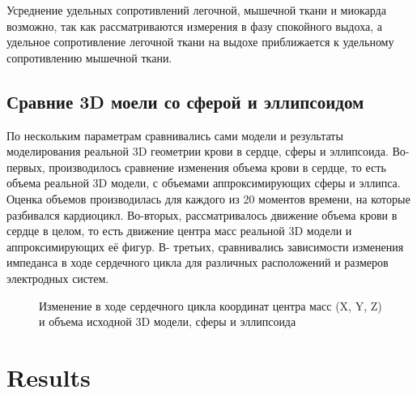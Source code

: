 \documentclass[conference]{IEEEtran}
\begin{document}
Усреднение удельных сопротивлений легочной, мышечной ткани и миокарда возможно, так как рассматриваются измерения в фазу спокойного выдоха, а удельное сопротивление легочной ткани на выдохе приближается к удельному сопротивлению мышечной ткани.

\subsection{Сравние 3D моели со сферой и эллипсоидом}

По нескольким параметрам сравнивались сами модели и результаты моделирования реальной 3D геометрии крови в сердце, сферы и эллипсоида.
Во-первых, производилось сравнение изменения объема крови в сердце, то есть объема реальной 3D модели, с объемами аппроксимирующих сферы и эллипса. Оценка объемов производилась для каждого из 20 моментов времени, на которые разбивался кардиоцикл.
Во-вторых, рассматривалось движение объема крови в сердце в целом, то есть движение центра масс реальной 3D модели и аппроксимирующих её фигур.
В- третьих, сравнивались зависимости изменения импеданса в ходе сердечного цикла для различных расположений и размеров электродных систем.

\begin{figure}[htbp]
    \caption{Изменение в ходе сердечного цикла координат центра масс (X, Y, Z) и объема исходной 3D модели, сферы и эллипсоида}
    \label{fig:rxyz}
\end{figure}

\section{Results}
\end{document}
